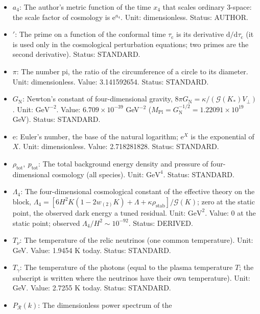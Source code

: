\documentclass[
  10pt,
]{article}
\providecommand{\tightlist}{%
  \setlength{\itemsep}{0pt}\setlength{\parskip}{0pt}}
\begin{document}
\begin{itemize}
\tightlist
\item
  \(a_4\): The author's metric function of the time \(x_4\) that scales
  ordinary 3-space: the scale factor of cosmology is
  \(\mathrm{e}^{a_4}\). Unit: dimensionless. Status: AUTHOR.
\item
  \({}'\): The prime on a function of the conformal time
  \(\tau_{\mathrm{c}}\) is its derivative
  \(\mathrm{d}/\mathrm{d}\tau_{\mathrm{c}}\) (it is used only in the
  cosmological perturbation equations; two primes are the second
  derivative). Status: STANDARD.
\item
  \(\pi\): The number pi, the ratio of the circumference of a circle to
  its diameter. Unit: dimensionless. Value: 3.141592654. Status:
  STANDARD.
\item
  \(G_{\mathrm{N}}\): Newton's constant of four-dimensional gravity,
  \(8\pi G_{\mathrm{N}} = \kappa/(\mathcal{G}(K_*)V_\perp)\). Unit:
  \(\mathrm{GeV}^{-2}\). Value: \(6.709\times10^{-39}\) GeV\(^{-2}\)
  (\(M_{\mathrm{Pl}} = G_{\mathrm{N}}^{-1/2} = 1.22091\times10^{19}\)
  GeV). Status: STANDARD.
\item
  \(\mathrm{e}\): Euler's number, the base of the natural logarithm;
  \(\mathrm{e}^{X}\) is the exponential of \(X\). Unit: dimensionless.
  Value: 2.718281828. Status: STANDARD.
\item
  \(\rho_{\mathrm{tot}},\ p_{\mathrm{tot}}\): The total background
  energy density and pressure of four-dimensional cosmology (all
  species). Unit: \(\mathrm{GeV}^{4}\). Status: STANDARD.
\item
  \(\Lambda_4\): The four-dimensional cosmological constant of the
  effective theory on the block,
  \(\Lambda_4 = [6H^2K(1 - 2w_{(2)}K) + \Lambda + \kappa\rho_{\mathrm{stab}}]/\mathcal{G}(K)\);
  zero at the static point, the observed dark energy a tuned residual.
  Unit: \(\mathrm{GeV}^{2}\). Value: 0 at the static point; observed
  \(\Lambda_4/H^2 \sim 10^{-92}\). Status: DERIVED.
\item
  \(T_\nu\): The temperature of the relic neutrinos (one common
  temperature). Unit: GeV. Value: 1.9454 K today. Status: STANDARD.
\item
  \(T_\gamma\): The temperature of the photons (equal to the plasma
  temperature \(T\); the subscript is written where the neutrinos have
  their own temperature). Unit: GeV. Value: 2.7255 K today. Status:
  STANDARD.
\item
  \(P_{\mathcal{R}}(k)\): The dimensionless power spectrum of the

\end{itemize}
\end{document}
